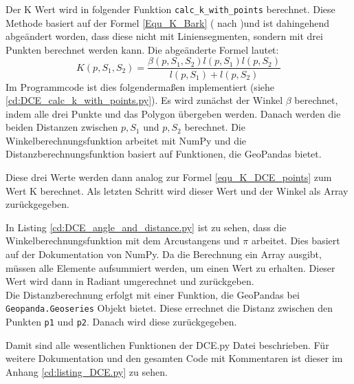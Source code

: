 {	Der K Wert wird in folgender Funktion \lstinline|calc_k_with_points| berechnet. Diese Methode basiert auf der Formel \ref{Equ_K_Bark} ( nach \citet{Latecki1999a})und ist dahingehend abgeändert worden, dass diese nicht mit Liniensegmenten, sondern mit drei Punkten berechnet werden kann. Die abgeänderte Formel lautet:
	\begin{equation}
		K(p,S_1,S_2) = \frac{\beta(p, S_1, S_2)l(p, S_1)l(p, S_2)}{l(p, S_1) + l(p, S_2)} 
		\label{equ_K_DCE_points}
	\end{equation}
	Im Programmcode ist dies folgendermaßen implementiert (siehe \ref{cd:DCE_calc_k_with_points.py}). Es wird zunächst der Winkel $\beta$ berechnet, indem alle drei Punkte und das Polygon übergeben werden. Danach werden die beiden Distanzen zwischen $p, S_1$ und $p, S_2$ berechnet. Die Winkelberechnungsfunktion arbeitet mit NumPy und die Distanzberechnungsfunktion basiert auf Funktionen, die GeoPandas bietet.
	
	Diese drei Werte werden dann analog zur Formel \ref{equ_K_DCE_points} zum Wert K berechnet. Als letzten Schritt wird dieser Wert und der Winkel als Array zurückgegeben.
	
	In Listing \ref{cd:DCE_angle_and_distance.py} ist zu sehen, dass die Winkelberechnungsfunktion mit dem Arcustangens und $\pi$ arbeitet. Dies basiert auf der Dokumentation von NumPy. Da die Berechnung ein Array ausgibt, müssen alle Elemente aufsummiert werden, um einen Wert zu erhalten. Dieser Wert wird dann in Radiant umgerechnet und zurückgeben. \\
	Die Distanzberechnung erfolgt mit einer Funktion, die GeoPandas bei \lstinline|Geopanda.Geoseries| Objekt bietet. Diese errechnet die Distanz zwischen den Punkten \lstinline|p1| und \lstinline|p2|. Danach wird diese zurückgegeben.
	
	Damit sind alle wesentlichen Funktionen der DCE.py Datei beschrieben. Für weitere Dokumentation und den gesamten Code mit Kommentaren ist dieser im Anhang \ref{cd:listing_DCE.py} zu sehen.
}


